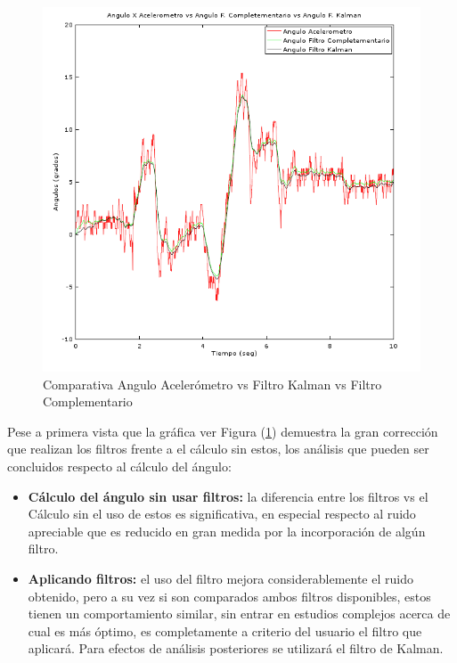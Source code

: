 \documentclass[12pt,a4paper]{article}
\begin{document}
\begin{figure}[H]
	\centering
	\includegraphics[scale=0.75]{images/angKalCom}
	\caption{Comparativa Angulo Acelerómetro vs Filtro Kalman vs Filtro Complementario}
	\label{fig:AnguloXvsFiltros}
\end{figure}

Pese a primera vista que la gráfica ver Figura (\ref{fig:AnguloXvsFiltros}) demuestra la gran corrección que realizan los filtros frente a el cálculo sin estos, los análisis que pueden ser concluidos respecto al cálculo del ángulo:
\begin{itemize}
	\item \textbf{Cálculo del ángulo sin usar filtros:} la diferencia entre los filtros vs el Cálculo sin el uso de estos es significativa, en especial respecto al ruido apreciable que es reducido en gran medida por la incorporación de algún filtro.
	\item \textbf{Aplicando filtros:} el uso del filtro mejora considerablemente el ruido obtenido, pero a su vez si son comparados ambos filtros disponibles, estos tienen un comportamiento similar, sin entrar en estudios complejos acerca de cual es más óptimo, es completamente a criterio del usuario el filtro que aplicará.
	Para efectos de análisis posteriores se utilizará el filtro de Kalman.
\end{itemize}
\end{document}
